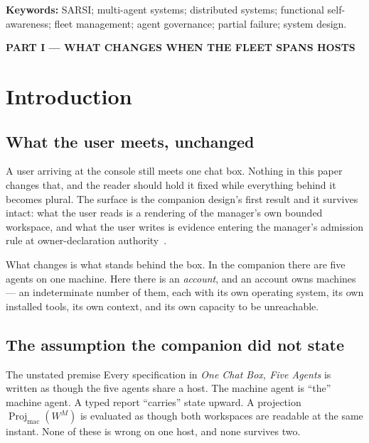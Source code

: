 \documentclass[11pt]{article}
\newcommand{\Proj}{\operatorname{Proj}}
\begin{document}
\vspace{2pt}
\noindent\textbf{Keywords:} SARSI; multi-agent systems; distributed systems; functional self-awareness; fleet management; agent governance; partial failure; system design.

\tableofcontents

\newpage
\begin{center}\large\bfseries PART I --- WHAT CHANGES WHEN THE FLEET SPANS HOSTS\end{center}

\section{Introduction}
\label{sec:intro}

\subsection{What the user meets, unchanged}

A user arriving at the console still meets one chat box. Nothing in this paper changes that, and the reader should hold it fixed while everything behind it becomes plural. The surface is the companion design's first result and it survives intact: what the user reads is a rendering of the manager's own bounded workspace, and what the user writes is evidence entering the manager's admission rule at owner-declaration authority~\citep{yang2026console}.

What changes is what stands behind the box. In the companion there are five agents on one machine. Here there is an \emph{account}, and an account owns machines --- an indeterminate number of them, each with its own operating system, its own installed tools, its own context, and its own capacity to be unreachable.

\subsection{The assumption the companion did not state}

\begin{cautionbox}{The unstated premise}
Every specification in \emph{One Chat Box, Five Agents} is written as though the five agents share a host. The machine agent is ``the'' machine agent. A typed report ``carries'' state upward. A projection $\Proj_{\mathrm{mac}}(W^{M})$ is evaluated as though both workspaces are readable at the same instant. None of these is wrong on one host, and none survives two.
\end{cautionbox}
\end{document}
